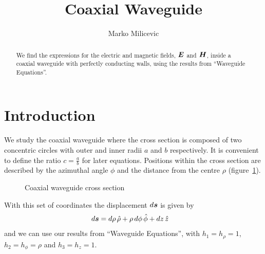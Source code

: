 \documentclass[twoside, a4paper]{article}
\title{Coaxial Waveguide}
\author{Marko Milicevic}
\date{}	%
\begin{document}
\maketitle
{}
\begin{abstract}
We find the expressions for the electric and magnetic fields, $\mbox{\boldmath$ E $}$ and $\mbox{\boldmath$ H $}$, inside a coaxial waveguide with perfectly conducting walls, using the results from ``Waveguide Equations''.
\end{abstract}

\tableofcontents
\newpage
{}
\section{Introduction}

We study the coaxial waveguide where the cross section is composed of two concentric circles with outer and inner radii $a$ and $b$ respectively. It is convenient to define the ratio $c = \frac{a}{b}$ for later equations. Positions within the cross section are described by the azimuthal angle $\phi$ and the distance from the centre $\rho$ (figure~\ref{fig:coaxial-waveguide}).

\begin{figure}[hbt]
	\centering
	\caption{Coaxial waveguide cross section}
	\label{fig:coaxial-waveguide}
\end{figure} 

With this set of coordinates the displacement $d\mbox{\boldmath$ s $}$ is given by
\begin{align*}
d\mbox{\boldmath$ s $} = d\rho \, \hat{\rho} & + \rho \, d\phi \, \hat{\phi} + dz \, \hat{z}
\end{align*}
and we can use our results from ``Waveguide Equations'', with $h_1 = h_\rho = 1$, $h_2 = h_\phi = \rho$ and $h_3 = h_z = 1$.
\end{document}

